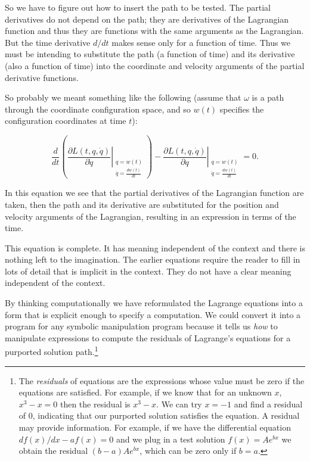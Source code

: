 \documentclass[11pt]{article}
\begin{document}
So we have to figure out how to insert the path to be tested. The partial
derivatives do not depend on the path; they are derivatives of the Lagrangian
function and thus they are functions with the same arguments as the Lagrangian.
But the time derivative \(d/dt\) makes sense only for a function of time. Thus we
must be intending to substitute the path (a function of time) and its derivative
(also a function of time) into the coordinate and velocity arguments of the
partial derivative functions.

So probably we meant something like the following (assume that \(\omega\) is a
path through the coordinate configuration space, and so \(w(t)\) specifies the
configuration coordinates at time \(t\)):

$$\frac{d}{d t}\left( \left.\frac{\partial L(t, q, \dot{q})}{\partial \dot{q}}
\right|_{\substack{ {q=w(t)} \\ {\dot{q}=\frac{d w(t)}{d t}} }}
\right)-\left.\frac{\partial L(t, q, \dot{q})}{\partial q}\right|_{ \substack{
q=w(t) \\ {\dot{q}=\frac{d w(t)}{d t}}} }=0.$$

In this equation we see that the partial derivatives of the Lagrangian function
are taken, then the path and its derivative are substituted for the position and
velocity arguments of the Lagrangian, resulting in an expression in terms of the
time.

This equation is complete. It has meaning independent of the context and there
is nothing left to the imagination. The earlier equations require the reader to
fill in lots of detail that is implicit in the context. They do not have a clear
meaning independent of the context.

By thinking computationally we have reformulated the Lagrange equations into a
form that is explicit enough to specify a computation. We could convert it into
a program for any symbolic manipulation program because it tells us \emph{how} to
manipulate expressions to compute the residuals of Lagrange’s equations for a
purported solution path.\footnote{The \emph{residuals} of equations are the expressions whose value must be zero
if the equations are satisfied. For example, if we know that for an unknown \(x\),
\(x^3-x=0\) then the residual is \(x^3 - x\). We can try \(x = -1\) and find a
residual of 0, indicating that our purported solution satisfies the equation. A
residual may provide information. For example, if we have the differential
equation \(df(x)/dx - af(x) = 0\) and we plug in a test solution \(f(x) = Ae^{bx}\)
we obtain the residual \((b-a)Ae^{bx}\), which can be zero only if \(b = a\).}
\end{document}
